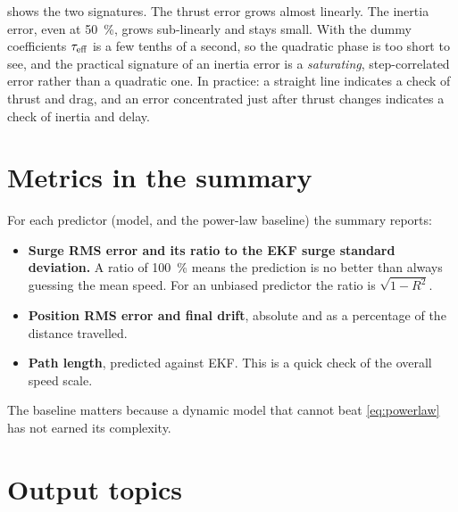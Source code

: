  shows the two signatures. The thrust error grows almost linearly. The
inertia error, even at \qty{50}{\percent}, grows sub-linearly and stays small. With the dummy
coefficients $\tau_\mathrm{eff}$ is a few tenths of a second, so the quadratic phase is too short to see,
and the practical signature of an inertia error is a \emph{saturating}, step-correlated error
rather than a quadratic one. In practice: a straight line indicates a check of thrust and drag, and an
error concentrated just after thrust changes indicates a check of inertia and delay.

\section{Metrics in the summary}

For each predictor (model, and the power-law baseline) the summary reports:
\begin{itemize}
  \item \textbf{Surge RMS error and its ratio to the EKF surge standard deviation.} A ratio of
        \qty{100}{\percent} means the prediction is no better than always guessing the mean speed.
        For an unbiased predictor the ratio is $\sqrt{1 - R^2}$.
  \item \textbf{Position RMS error and final drift}, absolute and as a percentage of the distance travelled.
  \item \textbf{Path length}, predicted against EKF. This is a quick check of the overall speed scale.
\end{itemize}
The baseline matters because a dynamic model that cannot beat \eqref{eq:powerlaw} has not
earned its complexity.

\section{Output topics}


